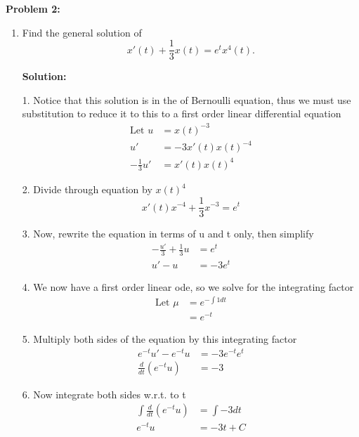 \documentclass[12pt]{article}
\begin{document}
\noindent \textbf{Problem 2:}
\begin{enumerate}
    \item[(a)] Find the general solution of
          \[ x'(t) + \frac{1}{3}x(t) = e^t x^4(t). \]

          \textbf{Solution:}

          1. Notice that this solution is in the of Bernoulli equation, thus we must use substitution to reduce it to this to a first order linear differential equation
          \begin{align*}
              \text{Let } u  & = x(t)^{-3}        \\
              u'             & = -3x'(t)x(t)^{-4} \\
              -\frac{1}{3}u' & = x'(t)x(t)^4
          \end{align*}

          2. Divide through equation by $x(t)^4$
          \[
              x'(t)x^{-4}+\frac{1}{3}x^{-3}=e^t
          \]

          3. Now, rewrite the equation in terms of u and t only, then simplify
          \begin{align*}
              -\frac{u'}{3}+\frac{1}{3}u & = e^t   \\
              u'-u                       & = -3e^t
          \end{align*}


          4. We now have a first order linear ode, so we solve for the integrating factor
          \begin{align*}
              \text{Let }\mu{} & = e^{-\int{1dt}} \\
                               & = e^{-t}
          \end{align*}

          5. Multiply both sides of the equation by this integrating factor
          \begin{align*}
              e^{-t}u'-e^{-t}u      & = -3e^{-t}e^t \\
              \frac{d}{dt}(e^{-t}u) & = -3
          \end{align*}

          6. Now integrate both sides w.r.t. to t
          \begin{align*}
              \int{\frac{d}{dt}(e^{-t}u)} & = \int{-3dt} \\
              e^{-t}u                     & = -3t + C
          \end{align*}


\end{enumerate}
\end{document}
